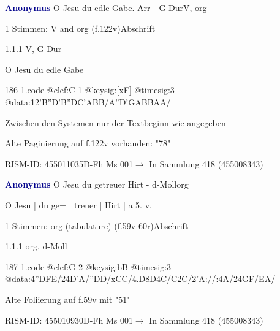 \documentclass[twocolumn, 12pt]{book}
\begin{document}
\par \vspace{16pt} \textcolor{darkblue}{\textbf{Anonymus  }}\hfillplus{\textbf{[186]}}\newline O Jesu du edle Gabe. Arr - G-Dur\newline V, org
\par \begin{itshape}\end{itshape} 
\par \textcolor{darkblue}{}  1 Stimmen: V and org  (f.122v)\newline Abschrift
\par 1.1.1  V, G-Dur\newline \begin{footnotesize} O Jesu du edle Gabe \end{footnotesize}  
\begin{filecontents*}{186-1.code}
@clef:C-1
@keysig:[xF]
@timesig:3
@data:12'B''D'B''DC'ABB/A''D'GABBAA/
\end{filecontents*}
\newline %
\par Zwischen den Systemen nur der Textbeginn wie angegeben
\par Alte Paginierung auf f.122v vorhanden: "78"
\par RISM-ID: 455011035\newline D-Fh  Ms 001\newline $\rightarrow$ In Sammlung 418 (455008343)
      
\par \vspace{16pt} \textcolor{darkblue}{\textbf{Anonymus  }}\hfillplus{\textbf{[187]}}\newline O Jesu du getreuer Hirt - d-Moll\newline org
\par \begin{itshape}[f.59v, at left:] O Jesu | du ge= | treuer | Hirt | a 5. v.\end{itshape} 
\par \textcolor{darkblue}{}  1 Stimmen: org (tabulature)  (f.59v-60r)\newline Abschrift
\par 1.1.1  org, d-Moll  
\begin{filecontents*}{187-1.code}
@clef:G-2
@keysig:bB
@timesig:3
@data:4''DFE/24D'A/''DD/xCC/4.D8D4C/C2C/2'A://:4A/24GF/EA/
\end{filecontents*}
\newline %
\par Alte Foliierung auf f.59v mit "51"
\par RISM-ID: 455010930\newline D-Fh  Ms 001\newline $\rightarrow$ In Sammlung 418 (455008343)
      
\end{document}
